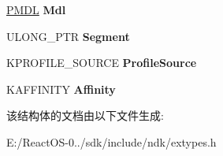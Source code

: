 \begin{DoxyCompactItemize}
\item 
\mbox{\label{struct___e_p_r_o_f_i_l_e_ac7c09d84d8ee73d0d277f0bb230b2d53}} 
\hyperlink{interfacevoid}{P\+M\+DL} {\bfseries Mdl}
\item 
\mbox{\label{struct___e_p_r_o_f_i_l_e_a7d7bdc9d9616a01f2c8e4065d038639e}} 
U\+L\+O\+N\+G\+\_\+\+P\+TR {\bfseries Segment}
\item 
\mbox{\label{struct___e_p_r_o_f_i_l_e_a9fa4e59b08e37059d2c0f78c3fce05af}} 
K\+P\+R\+O\+F\+I\+L\+E\+\_\+\+S\+O\+U\+R\+CE {\bfseries Profile\+Source}
\item 
\mbox{\label{struct___e_p_r_o_f_i_l_e_a05c573809aa9e1d9f5c4a2690660f03e}} 
K\+A\+F\+F\+I\+N\+I\+TY {\bfseries Affinity}
\end{DoxyCompactItemize}


该结构体的文档由以下文件生成\+:\begin{DoxyCompactItemize}
\item 
E\+:/\+React\+O\+S-\/0../sdk/include/ndk/extypes.\+h\end{DoxyCompactItemize}
